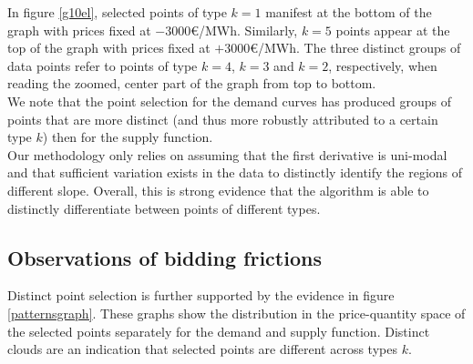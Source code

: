 In figure \ref{g10el}, selected points of type $k=1$ manifest at the bottom of the graph with prices fixed at $-3000$\euro /MWh. Similarly, $k=5$ points appear at the top of the graph with prices fixed at $+3000$\euro /MWh. The three distinct groups of data points refer to points of type $k=4$, $k=3$ and $k=2$, respectively, when reading the zoomed, center part of the graph from top to bottom.\\

We note that the point selection for the demand curves has produced groups of points that are more distinct (and thus more robustly attributed to a certain type $k$) then for the supply function. \\

Our methodology only relies on assuming that the first derivative is uni-modal and that sufficient variation exists in the data to distinctly identify the regions of different slope. Overall, this is strong evidence that the algorithm is able to distinctly differentiate between points of different types. \\

\subsection{Observations of bidding frictions}
Distinct point selection is further supported by the evidence in figure \ref{patternsgraph}. These graphs show the distribution in the price-quantity space of the selected points separately for the demand and supply function. Distinct clouds are an indication that selected points are different across types $k$.\\

